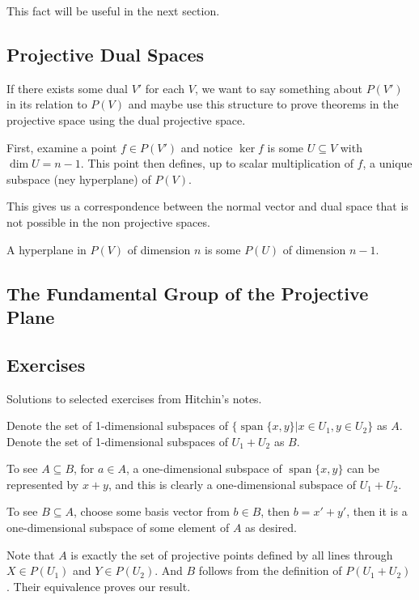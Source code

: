\documentclass[10pt]{article}
\begin{document}
This fact will be useful in the next section.

\subsection{Projective Dual Spaces}

If there exists some dual $V'$ for each $V$, we want to say something about
$P(V')$ in its relation to $P(V)$ and maybe use this structure to prove
theorems in the projective space using the dual projective space. 

First, examine a point $f \in P(V')$ and notice $\ker f$ is some $U \subseteq
V$ with $\dim U = n-1$. This point then defines, up to scalar multiplication of
$f$, a unique subspace (ney hyperplane) of $P(V)$.

This gives us a correspondence between the normal vector and dual space that is
not possible in the non projective spaces.

\begin{definition}
	A hyperplane in $P(V)$ of dimension $n$ is some $P(U)$ of dimension $n-1$.
\end{definition}

\subsection{The Fundamental Group of the Projective Plane}

\subsection{Exercises}

Solutions to selected exercises from Hitchin's notes.

\begin{exercise}

	Denote the set of 1-dimensional subspaces of $\{ \operatorname{span} \{x, y\} | x \in U_1,
y \in U_2 \}$ as $A$. Denote the set of 1-dimensional subspaces of $U_1 +
U_2$ as $B$.

To see $A \subseteq B$, for $a \in A$, a one-dimensional subspace of
$\operatorname{span} \{x, y\}$ can be represented by $x + y$, and this is clearly a
one-dimensional subspace of $U_1 + U_2$.

To see $B \subseteq A$, choose some basis vector from $b \in B$, then $b = x'
+ y'$, then it is a one-dimensional subspace of some element of $A$ as
desired.

Note that $A$ is exactly the set of projective points defined by all lines
through $X \in P(U_1)$ and $Y \in P(U_2)$. And $B$ follows from the definition
of $P(U_1 + U_2)$. Their equivalence proves our result.

\end{exercise}
\end{document}
